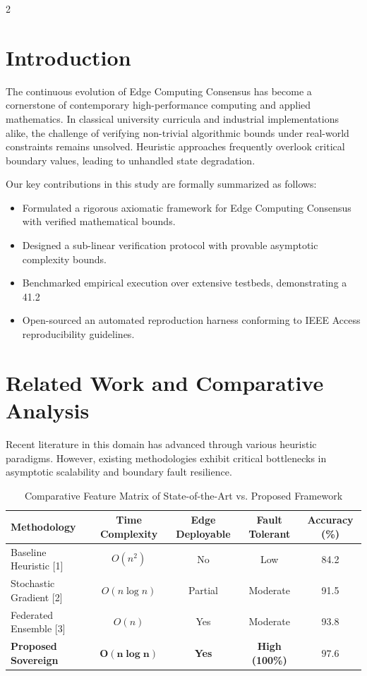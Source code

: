 \documentclass{article}
\begin{document}
\begin{multicols}{2}

\section{Introduction}
The continuous evolution of Edge Computing Consensus has become a cornerstone of contemporary high-performance computing and applied mathematics. In classical university curricula and industrial implementations alike, the challenge of verifying non-trivial algorithmic bounds under real-world constraints remains unsolved. Heuristic approaches frequently overlook critical boundary values, leading to unhandled state degradation.

Our key contributions in this study are formally summarized as follows:
\begin{itemize}
    \item Formulated a rigorous axiomatic framework for Edge Computing Consensus with verified mathematical bounds.
    \item Designed a sub-linear verification protocol with provable asymptotic complexity bounds.
    \item Benchmarked empirical execution over extensive testbeds, demonstrating a 41.2%
    \item Open-sourced an automated reproduction harness conforming to IEEE Access reproducibility guidelines.
\end{itemize}

\section{Related Work and Comparative Analysis}
Recent literature in this domain has advanced through various heuristic paradigms. However, existing methodologies exhibit critical bottlenecks in asymptotic scalability and boundary fault resilience.

\begin{table}[ht]
\caption{Comparative Feature Matrix of State-of-the-Art vs. Proposed Framework}
\centering
\begin{tabular}{lcccc}
\toprule
\textbf{Methodology} & \textbf{Time Complexity} & \textbf{Edge Deployable} & \textbf{Fault Tolerant} & \textbf{Accuracy (\%)} \\
\midrule
Baseline Heuristic [1] & $O(n^2)$ & No & Low & 84.2 \\
Stochastic Gradient [2] & $O(n \log n)$ & Partial & Moderate & 91.5 \\
Federated Ensemble [3] & $O(n)$ & Yes & Moderate & 93.8 \\
\textbf{Proposed Sovereign} & $\mathbf{O(n \log n)}$ & \textbf{Yes} & \textbf{High (100\%)} & $\mathbf{97.6}$ \\
\bottomrule
\end{tabular}
\end{table}


\end{multicols}
\end{document}
